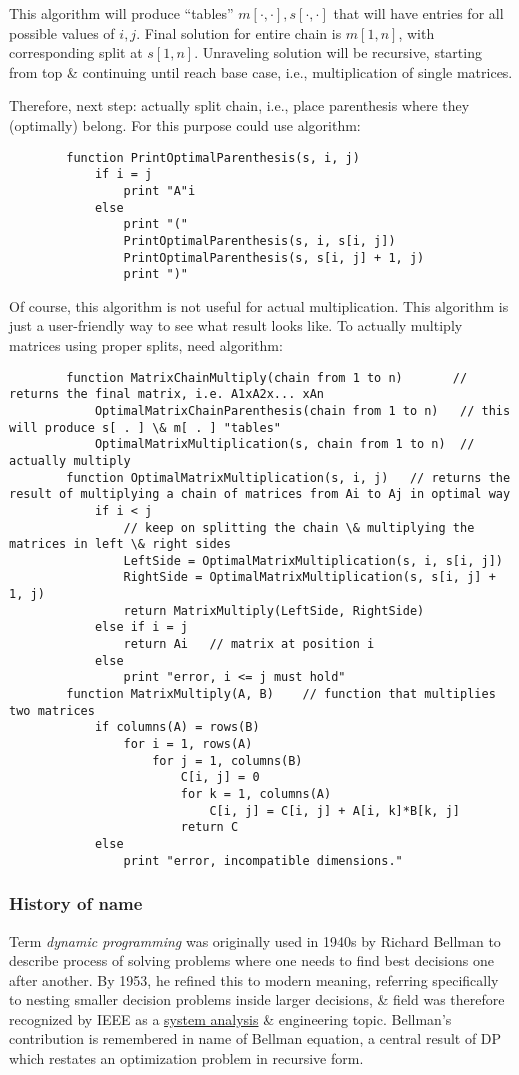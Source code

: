 \documentclass{article}
\begin{document}
\begin{enumerate}
	This algorithm will produce ``tables'' $m[\cdot,\cdot],s[\cdot,\cdot]$ that will have entries for all possible values of $i,j$. Final solution for entire chain is $m[1,n]$, with corresponding split at $s[1,n]$. Unraveling solution will be recursive, starting from top \& continuing until reach base case, i.e., multiplication of single matrices.

	Therefore, next step: actually split chain, i.e., place parenthesis where they (optimally) belong. For this purpose could use algorithm:
	\begin{verbatim}
		function PrintOptimalParenthesis(s, i, j)
		    if i = j
		        print "A"i
		    else
		        print "("
		        PrintOptimalParenthesis(s, i, s[i, j])
		        PrintOptimalParenthesis(s, s[i, j] + 1, j)
		        print ")"
	\end{verbatim}
	Of course, this algorithm is not useful for actual multiplication. This algorithm is just a user-friendly way to see what result looks like. To actually multiply matrices using proper splits, need algorithm:
	\begin{verbatim}
		function MatrixChainMultiply(chain from 1 to n)       // returns the final matrix, i.e. A1xA2x... xAn
		    OptimalMatrixChainParenthesis(chain from 1 to n)   // this will produce s[ . ] \& m[ . ] "tables"
		    OptimalMatrixMultiplication(s, chain from 1 to n)  // actually multiply
		function OptimalMatrixMultiplication(s, i, j)   // returns the result of multiplying a chain of matrices from Ai to Aj in optimal way
		    if i < j
		        // keep on splitting the chain \& multiplying the matrices in left \& right sides
		        LeftSide = OptimalMatrixMultiplication(s, i, s[i, j])
		        RightSide = OptimalMatrixMultiplication(s, s[i, j] + 1, j)
		        return MatrixMultiply(LeftSide, RightSide)
		    else if i = j
		        return Ai   // matrix at position i
		    else
		        print "error, i <= j must hold"
	    function MatrixMultiply(A, B)    // function that multiplies two matrices
	        if columns(A) = rows(B)
	            for i = 1, rows(A)
	                for j = 1, columns(B)
	                    C[i, j] = 0
	                    for k = 1, columns(A)
	                        C[i, j] = C[i, j] + A[i, k]*B[k, j]
	                    return C
	        else
	            print "error, incompatible dimensions."
	\end{verbatim}
\end{enumerate}

\subsubsection{History of name}
Term {\it dynamic programming} was originally used in 1940s by {\sc Richard Bellman} to describe process of solving problems where one needs to find best decisions one after another. By 1953, he refined this to modern meaning, referring specifically to nesting smaller decision problems inside larger decisions, \& field was therefore recognized by IEEE as a \href{https://en.wikipedia.org/wiki/Systems_analysis}{system analysis} \& engineering topic. {\sc Bellman}'s contribution is remembered in name of Bellman equation, a central result of DP which restates an optimization problem in recursive form.
\end{document}
